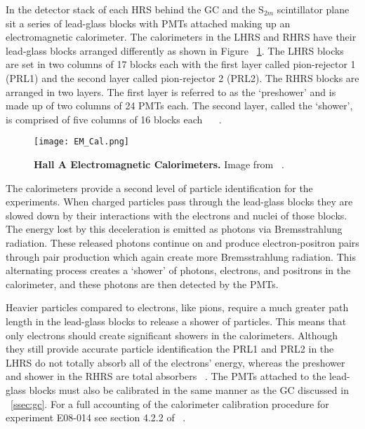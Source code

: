 In the detector stack of each HRS behind the GC and the S$_{2m}$ scintillator plane sit a series of lead-glass blocks with PMTs attached making up an electromagnetic calorimeter. The calorimeters in the LHRS and RHRS have their lead-glass blocks arranged differently as shown in Figure ~\ref{fig:em_cal}. The LHRS blocks are set in two columns of 17 blocks each with the first layer called pion-rejector 1 (PRL1) and the second layer called pion-rejector 2 (PRL2). The RHRS blocks are arranged in two layers. The first layer is referred to as the `preshower' and is made up of two columns of 24 PMTs each. The second layer, called the `shower', is comprised of five columns of 16 blocks each ~\cite{Thesis:Ye} ~\cite{Article:HallA}. 

\begin{figure}[!ht]
\begin{center}
\texttt{[image: EM\_Cal.png]}
\end{center}
\caption[Hall A Electromagnetic Calorimeters]{
{\bf{Hall A Electromagnetic Calorimeters.}} Image from ~\cite{Article:HallA}.}
\label{fig:em_cal}
\end{figure}

The calorimeters provide a second level of particle identification for the experiments. When charged particles pass through the lead-glass blocks they are slowed down by their interactions with the electrons and nuclei of those blocks. The energy lost by this deceleration is emitted as photons via Bremsstrahlung radiation. These released photons continue on and produce electron-positron pairs through pair production which again create more Bremsstrahlung radiation. This alternating process creates a `shower' of photons, electrons, and positrons in the calorimeter, and these photons are then detected by the PMTs. 

Heavier particles compared to electrons, like pions, require a much greater path length in the lead-glass blocks to release a shower of particles. This means that only electrons should create significant showers in the calorimeters. Although they still provide accurate particle identification the PRL1 and PRL2 in the LHRS do not totally absorb all of the electrons' energy, whereas the preshower and shower in the RHRS are total absorbers ~\cite{Thesis:Ye}. The PMTs attached to the lead-glass blocks must also be calibrated in the same manner as the GC discussed in ~\ref{ssec:gc}. For a full accounting of the calorimeter calibration procedure for experiment E08-014 see section 4.2.2 of ~\cite{Thesis:Ye}.

